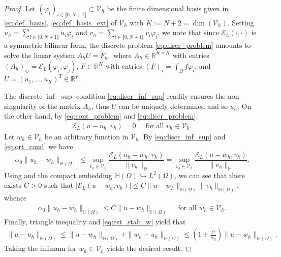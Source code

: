\documentclass[11 pt]{article}
\newcommand\inter[1]{\llbracket #1\rrbracket}
\numberwithin{equation}{section}
\def\R{\mathbb{R}}
\def\cE{\mathcal{E}}
\begin{document}
\begin{proof}
Let $(\varphi_i)_{i\in \inter{0,N+1}}\subset \mathcal V_h$ be the finite dimensional basis given in \eqref{eq:def_basis}, \eqref{eq:def_basis_ext} of $\mathcal V_h$ with $K:=N+2=\dim(\mathcal V_h)$. Setting $u_h=\sum_{i\in\inter{0,N+1}}u_i \varphi_i$ and $v_h=\sum_{i\in\inter{0,N+1}} v_i \varphi_i$, we note that since $\cE_{L}(\cdot,\cdot)$ is a symmetric bilinear form, the discrete problem \eqref{eq:discr_problem} amounts to solve the linear system $A_h U = F_h,$ where $A_h\in\mathbb R^{K\times K}$ with entries $(A_h)_{ij}=\cE_L(\varphi_i,\varphi_j)$, $F\in\R^{K}$ with entries $(F)_i=\int_{\Omega}f \varphi_i$, and $U=(u_1,\ldots, u_K)^T\in \R^{K}$.

The discrete $\inf$-$\sup$ condition \eqref{eq:discr_inf_sup} readily ensures the non-singularity of the matrix $A_h$, thus $U$ can be uniquely determined and so $u_h$. On the other hand, by \eqref{eq:cont_problem} and \eqref{eq:discr_problem},
%
\begin{align}\label{eq:ort_cond}
    \cE_{L}(u-u_h,v_h)=0 \quad\text{ for all } v_h\in\mathcal V_h.
\end{align}
%
Let $w_h\in\mathcal V_h$ be an arbitrary function in $\mathcal V_h$. By \eqref{eq:discr_inf_sup} and \eqref{eq:ort_cond} we have
%
\begin{equation*}
    \alpha_0\|u_h-w_h\|_{\mathbb H(\Omega)} \leq \sup_{v_h\in\mathcal V_h}\frac{\cE_{L}(u_h-w_h,v_h)}{\|v_h\|_{\mathbb H}}=\sup_{v_h\in\mathcal V_h}\frac{\cE_{L}(u-w_h,v_h)}{\|v_h\|_{\mathbb H}}.
\end{equation*}
%
Using \cite[Lemma 3.4]{HSS22} and the compact embedding $\mathbb H(\Omega)\hookrightarrow L^2(\Omega)$, we can see that there exists $C>0$ such that $|\cE_{L}(u-w_h,v_h)|\leq C\|u-w_h\|_{\mathbb H(\Omega)}\|v_h\|_{\mathbb H(\Omega)},$ whence
%
\begin{align}\label{eq:est_stab_w}
    \alpha_0\|u_h-w_h\|_{\mathbb H(\Omega)} \leq C\|u-w_h\|_{\mathbb H(\Omega)} \quad\text{ for all } w_h\in\mathcal V_h.
\end{align}
Finally, triangle inequality and \eqref{eq:est_stab_w} yield that
\begin{align*}
\|u-u_h\|_{\mathbb H(\Omega)}\leq \|u-w_h\|_{\mathbb H(\Omega)}+\|w_h-u_h\|_{\mathbb H(\Omega)}\leq \left(1+\frac{C}{\alpha_0}\right)\|u-w_h\|_{\mathbb H(\Omega)}.
\end{align*}
Taking the infimum for $w_h\in \mathcal V_h$ yields the desired result.
\end{proof}
\end{document}
